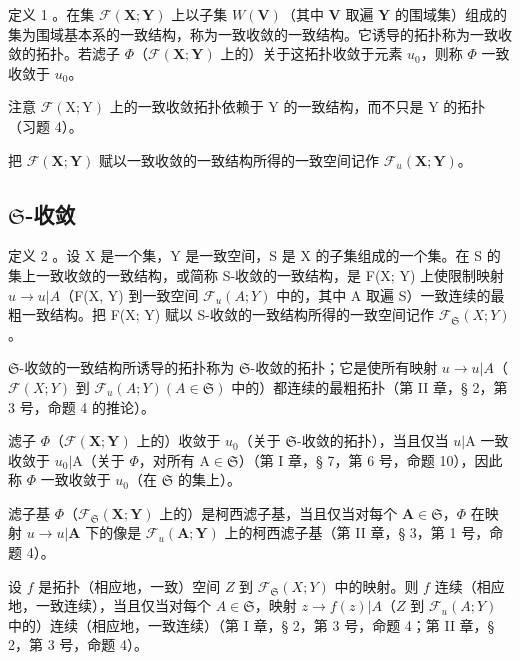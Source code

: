 定义 1 。在集 \(\mathcal{F}(\mathbf{X};\mathbf{Y})\) 上以子集 \(W(\mathbf{V})\)（其中 \(\mathbf{V}\) 取遍 \(\mathbf{Y}\) 的围域集）组成的集为围域基本系的一致结构，称为一致收敛的一致结构。它诱导的拓扑称为一致收敛的拓扑。若滤子 \(\Phi\)（\(\mathcal{F}(\mathbf{X};\mathbf{Y})\) 上的）关于这拓扑收敛于元素 \(u_0\)，则称 \(\Phi\) 一致收敛于 \(u_0\)。

注意 \(\mathcal{F}(\mathrm{X};\mathrm{Y})\) 上的一致收敛拓扑依赖于 Y 的一致结构，而不只是 Y 的拓扑（习题 4）。

把 \(\mathcal{F}(\mathbf{X};\mathbf{Y})\) 赋以一致收敛的一致结构所得的一致空间记作 \(\mathcal{F}_u(\mathbf{X};\mathbf{Y})\)。

\subsection{\texorpdfstring{\(\mathfrak{S}\)-收敛}{S-收敛}}

定义 2 。设 X 是一个集，Y 是一致空间，S 是 X 的子集组成的一个集。在 S 的集上一致收敛的一致结构，或简称 S-收敛的一致结构，是 F(X; Y) 上使限制映射 \(u \to u|A\)（F(X, Y) 到一致空间 \(\mathcal{F}_u(A; Y)\) 中的，其中 A 取遍 S）一致连续的最粗一致结构。把 F(X; Y) 赋以 S-收敛的一致结构所得的一致空间记作 \(\mathcal{F}_{\mathfrak{S}}(X; Y)\)。

\(\mathfrak{S}\)-收敛的一致结构所诱导的拓扑称为 \(\mathfrak{S}\)-收敛的拓扑；它是使所有映射 \(u \to u|A\)（\(\mathcal{F}(X; Y)\) 到 \(\mathcal{F}_u(A; Y) (A \in \mathfrak{S})\) 中的）都连续的最粗拓扑（第 II 章，§ 2，第 3 号，命题 4 的推论）。

滤子 \(\Phi\)（\(\mathcal{F}(\mathbf{X};\mathbf{Y})\) 上的）收敛于 \(u_{0}\)（关于 \(\mathfrak{S}\)-收敛的拓扑），当且仅当 \(u|\mathrm{A}\) 一致收敛于 \(u_{0}|\mathrm{A}\)（关于 \(\Phi\)，对所有 \(\mathrm{A}\in \mathfrak{S}\)）（第 I 章，§ 7，第 6 号，命题 10），因此称 \(\Phi\) 一致收敛于 \(u_{0}\)（在 \(\mathfrak{S}\) 的集上）。

滤子基 \(\Phi\)（\(\mathcal{F}_{\mathfrak{S}}(\mathbf{X};\mathbf{Y})\) 上的）是柯西滤子基，当且仅当对每个 \(\mathbf{A}\in\mathfrak{S}\)，\(\Phi\) 在映射 \(u\to u|\mathbf{A}\) 下的像是 \(\mathcal{F}_{u}(\mathbf{A};\mathbf{Y})\) 上的柯西滤子基（第 II 章，§ 3，第 1 号，命题 4）。

设 \(f\) 是拓扑（相应地，一致）空间 \(Z\) 到 \(\mathcal{F}_{\mathfrak{S}}(X; Y)\) 中的映射。则 \(f\) 连续（相应地，一致连续），当且仅当对每个 \(A \in \mathfrak{S}\)，映射 \(z \to f(z)|A\)（\(Z\) 到 \(\mathcal{F}_u(A; Y)\) 中的）连续（相应地，一致连续）（第 I 章，§ 2，第 3 号，命题 4；第 II 章，§ 2，第 3 号，命题 4）。

